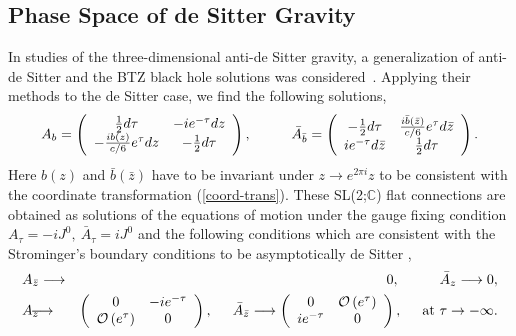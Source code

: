 \documentclass[a4paper,11pt]{article}
\begin{document}
\subsection{Phase Space of de Sitter Gravity}
In studies of the three-dimensional anti-de Sitter gravity, 
a generalization of anti-de Sitter and the BTZ black hole solutions 
was considered~\cite{CHD-BO, Banados-Ortiz, Banados1, NUY}.
Applying their methods to the de Sitter case, 
we find the following solutions,
\begin{equation}
\label{general-solution}
 A_b = 
  \left(\begin{array}{cc}
   \frac{1}{2}d\tau & -ie^{-\tau}dz \\
   -\frac{ib(z)}{c/6}e^{\tau}dz & -\frac{1}{2}d\tau 
       \end{array}\right),
\hspace{10mm}
\bar{A}_{\bar{b}} = 
  \left(\begin{array}{cc}
   -\frac{1}{2}d\tau & 
      \frac{i\bar{b}(\bar{z})}{c/6}e^{\tau}d\bar{z} \\
   ie^{-\tau}d\bar{z} & \frac{1}{2}d\tau 
       \end{array}\right).
\end{equation}
Here $b(z)$ and $\bar{b}(\bar{z})$ have to be invariant under 
$z\rightarrow e^{2\pi i}z$ to be consistent with the coordinate
transformation (\ref{coord-trans}).
These SL(2;$\mathbb{C}$) flat connections are obtained as solutions of 
the equations of motion under the gauge fixing condition 
$A_\tau=-iJ^0, \ \bar{A}_\tau=iJ^0$ and the following conditions 
which are consistent with the Strominger's boundary conditions to be 
asymptotically de Sitter \cite{Strominger},
\begin{eqnarray}
\label{cond1}
A_{\bar{z}} &\longrightarrow & 0, \hspace{10mm}
   \bar{A}_z \longrightarrow 0,  \\
\label{cond2}
A_z &\hspace{-3mm} \longrightarrow \hspace{-3mm}& 
  \left(\begin{array}{cc}
   0 & -ie^{-\tau} \\
   {\cal O}\left(e^{\tau}\right) & 0
	\end{array}\right), \hspace{5mm}
\bar{A}_{\bar{z}} \longrightarrow 
   \left(\begin{array}{cc}
   0 & {\cal O}\left(e^{\tau}\right) \\
   ie^{-\tau} & 0 
         \end{array}\right), 
 \hspace{5mm}
   \mbox{at} \ \tau \rightarrow -\infty.
\end{eqnarray}
\end{document}
